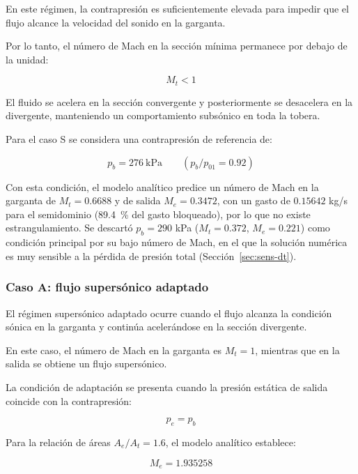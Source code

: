 \documentclass[12pt,letterpaper]{article}
\numberwithin{equation}{section}
\begin{document}
En este régimen, la contrapresión es suficientemente
elevada para impedir que el flujo alcance la
velocidad del sonido en la garganta.

Por lo tanto, el número de Mach en la sección
mínima permanece por debajo de la unidad:

\begin{equation}
    M_t<1
\end{equation}

El fluido se acelera en la sección convergente
y posteriormente se desacelera en la divergente,
manteniendo un comportamiento subsónico en
toda la tobera.

Para el caso S se considera una contrapresión
de referencia de:

\begin{equation}
    p_b=276\ \mathrm{kPa}
    \qquad (p_b/p_{01}=0.92)
\end{equation}

Con esta condición, el modelo analítico predice
un número de Mach en la garganta de
$M_t=0.6688$ y de salida $M_e=0.3472$, con un gasto
de $0.15642$ kg/s para el semidominio (89.4~\% del gasto
bloqueado), por lo que no existe estrangulamiento.
Se descartó $p_b=290$ kPa ($M_t=0.372$, $M_e=0.221$) como
condición principal por su bajo número de Mach, en el que la
solución numérica es muy sensible a la pérdida de presión total
(Sección~\ref{sec:sens-dt}).

\subsubsection{Caso A: flujo supersónico adaptado}

El régimen supersónico adaptado ocurre cuando
el flujo alcanza la condición sónica en la
garganta y continúa acelerándose en la
sección divergente.

En este caso, el número de Mach en la garganta
es $M_t=1$, mientras que en la salida se
obtiene un flujo supersónico.

La condición de adaptación se presenta cuando
la presión estática de salida coincide con
la contrapresión:

\begin{equation}
    p_e=p_b
\end{equation}

Para la relación de áreas $A_e/A_t=1.6$,
el modelo analítico establece:

\begin{equation}
    M_e=1.935258
\end{equation}
\end{document}
